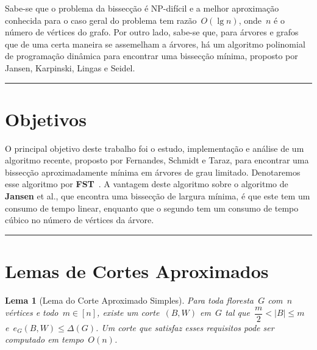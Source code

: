 \documentclass[a0,portrait]{a0poster}
\newtheorem{lem}{Lema}
\begin{document}
\begin{multicols}{3}
    Sabe-se que o problema da bissecção é NP-difícil%
    e a melhor aproximação conhecida para o caso geral do problema tem 
    razão~$O(\lg n)$, onde~$n$ é o número de vértices 
    do grafo. 
    Por outro lado, sabe-se que, para árvores e grafos que de uma 
    certa maneira se assemelham a árvores, há um algoritmo polinomial 
    de programação dinâmica para encontrar uma bissecção mínima, 
    proposto por Jansen, Karpinski, Lingas e Seidel. 

\noindent\rule[0.5ex]{\linewidth}{1pt}



\color{Black} %


\section*{Objetivos}

    O principal objetivo deste trabalho foi o estudo, implementação e 
    análise de um algoritmo recente, proposto por Fernandes, Schmidt e 
    Taraz, para encontrar uma bissecção 
    aproximadamente mínima em árvores de grau limitado. Denotaremos
    esse algoritmo por \textbf{FST}~\cite{Schmidt15}. 
    A vantagem deste algoritmo sobre o algoritmo de \textbf{Jansen} et 
    al., que encontra uma bissecção de largura 
    mínima, é que este tem um consumo de tempo linear, enquanto que o 
    segundo tem um consumo de tempo cúbico no número de vértices da 
    árvore. 

\noindent\rule[0.5ex]{\linewidth}{1pt}


\section* {Lemas de Cortes Aproximados}

\begin{lem}[Lema do Corte Aproximado Simples]
    Para toda floresta~$G$ com~$n$ vértices e todo~${m \in [n]}$,
    existe um corte~$(B,W)$ em~$G$ tal 
    que~${\dfrac{m}{2} <|B| \le m}$ e~${e_G(B,W) \le \Delta(G)}$.
    Um corte que satisfaz esses requisitos pode ser computado em
    tempo~$O(n)$.
\end{lem}


\end{multicols}
\end{document}
